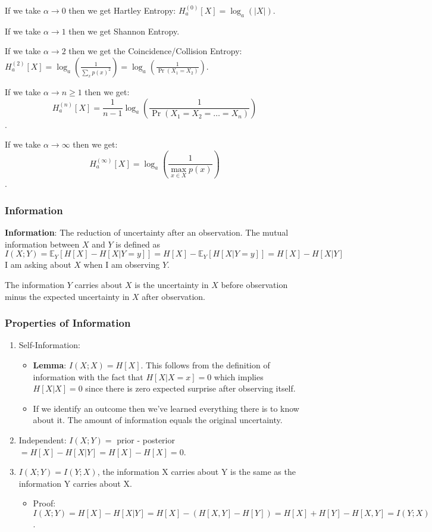 If we take \( \alpha \to 0 \) then we get Hartley Entropy: \( H_a^{(0)}[X] = \log_a(|X|) \).

If we take \( \alpha \to 1 \) then we get Shannon Entropy.

If we take \( \alpha \to 2 \) then we get the Coincidence/Collision Entropy: \( H_a^{(2)}[X] = \log_a \left( \frac{1}{\sum_x p(x)^2} \right) = \log_a \left( \frac{1}{\Pr(X_1 = X_2)} \right) \).

If we take \( \alpha \to n \geq 1 \) then we get:
\[ H_a^{(n)}[X] = \frac{1}{n - 1} \log_a \left( \frac{1}{\Pr(X_1 = X_2 = \ldots = X_n)} \right) \].

If we take \( \alpha \to \infty \) then we get:
\[ H_a^{(\infty)}[X] = \log_a \left( \frac{1}{\max_{x \in X} p(x)} \right) \].

\subsubsection{Information}

\textbf{Information}: The reduction of uncertainty after an observation. The mutual information between \( X \) and \( Y \) is defined as
\[ I(X; Y) = \mathbb{E}_Y[H[X] - H[X | Y=y]] = H[X] - \mathbb{E}_Y[H[X | Y=y]] = H[X] - H[X | Y] \]
I am asking about \( X \) when I am observing \( Y \).

The information \( Y \) carries about \( X \) is the uncertainty in \( X \) before observation minus the expected uncertainty in \( X \) after observation.

\subsubsection{Properties of Information}
\begin{enumerate}
    \item Self-Information:
    \begin{itemize}
        \item \textbf{Lemma}: \( I(X; X) = H[X] \). This follows from the definition of information with the fact that \( H[X | X=x] = 0 \) which implies \( H[X | X] = 0 \) since there is zero expected surprise after observing itself.
        \item If we identify an outcome then we’ve learned everything there is to know about it. The amount of information equals the original uncertainty.
    \end{itemize}
    \item Independent: \( I(X; Y) = \) prior - posterior \( = H[X] - H[X | Y] = H[X] - H[X] = 0 \).
    \item \( I(X; Y) = I(Y; X) \), the information X carries about Y is the same as the information Y carries about X.
    \begin{itemize}
        \item Proof: \( I(X; Y) = H[X] - H[X | Y] = H[X] - (H[X, Y] - H[Y]) = H[X] + H[Y] - H[X, Y] = I(Y; X) \).
    \end{itemize}
\end{enumerate}
